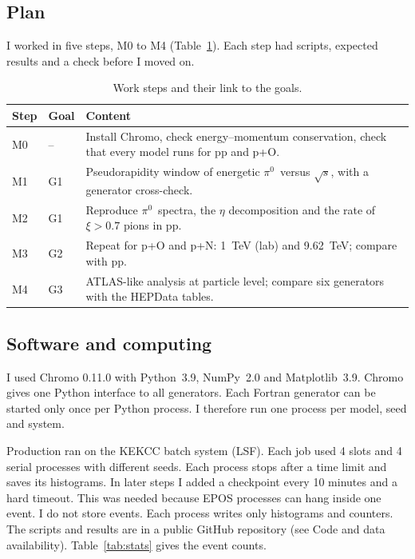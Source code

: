 \documentclass[11pt,a4paper]{article}
\newcommand{\pizero}{\ensuremath{\pi^{0}}}
\begin{document}
\subsection{Plan}
I worked in five steps, M0 to M4 (Table~\ref{tab:steps}).
Each step had scripts, expected results and a check before I moved on.

\begin{table}[!htbp]
\centering
\small
\caption{Work steps and their link to the goals.}
\label{tab:steps}
\begin{tabular}{@{}llp{8.6cm}@{}}
\toprule
Step & Goal & Content\\
\midrule
M0 & -- & Install Chromo, check energy--momentum conservation, check that every model runs for pp and p+O.\\
M1 & G1 & Pseudorapidity window of energetic \pizero\ versus $\sqrt{s}$, with a generator cross-check.\\
M2 & G1 & Reproduce \pizero\ spectra, the $\eta$ decomposition and the rate of $\xi>0.7$ pions in pp.\\
M3 & G2 & Repeat for p+O and p+N: 1~TeV (lab) and 9.62~TeV; compare with pp.\\
M4 & G3 & ATLAS-like analysis at particle level; compare six generators with the HEPData tables.\\
\bottomrule
\end{tabular}
\end{table}

\subsection{Software and computing}
I used Chromo 0.11.0 \cite{Fedynitch:2025chromo} with Python~3.9, NumPy~2.0 and Matplotlib~3.9.
Chromo gives one Python interface to all generators.
Each Fortran generator can be started only once per Python process.
I therefore run one process per model, seed and system.

Production ran on the KEKCC batch system (LSF).
Each job used 4 slots and 4 serial processes with different seeds.
Each process stops after a time limit and saves its histograms.
In later steps I added a checkpoint every 10 minutes and a hard timeout.
This was needed because EPOS processes can hang inside one event.
I do not store events. Each process writes only histograms and counters.
The scripts and results are in a public GitHub repository (see Code and data availability).
Table~\ref{tab:stats} gives the event counts.
\end{document}
